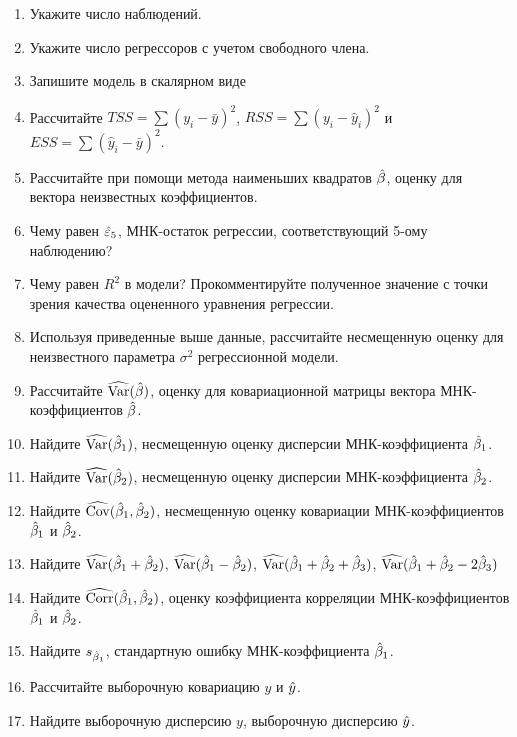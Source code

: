 \begin{problem}
\begin{enumerate}
\item Укажите число наблюдений.
\item Укажите число регрессоров с учетом свободного члена.
\item Запишите модель в скалярном виде
\item Рассчитайте $TSS=\sum (y_i-\bar{y})^2$, $RSS=\sum (y_i-\hat{y}_i)^2$ и $ESS=\sum (\hat{y}_i-\bar{y})^2$.
\item Рассчитайте при помощи метода наименьших квадратов $\hat{\beta}$, оценку для вектора неизвестных коэффициентов.
\item Чему равен $\hat{\varepsilon}_5$, МНК-остаток регрессии, соответствующий 5-ому наблюдению?
\item Чему равен $R^2$  в модели? Прокомментируйте полученное значение с точки зрения качества оцененного уравнения регрессии.
\item Используя приведенные выше данные, рассчитайте несмещенную оценку для неизвестного параметра $\sigma^2$ регрессионной модели.
\item Рассчитайте $\widehat{\operatorname{Var}}(\hat{\beta})$, оценку для ковариационной матрицы вектора МНК-коэффициентов $\hat{\beta}$.  
\item Найдите $\widehat{\operatorname{Var}}(\hat{\beta}_1)$, несмещенную оценку дисперсии МНК-коэффициента $\hat{\beta}_1$.
\item Найдите $\widehat{\operatorname{Var}}(\hat{\beta}_2)$, несмещенную оценку дисперсии МНК-коэффициента $\hat{\beta}_2$.
\item Найдите $\widehat{\operatorname{Cov}}(\hat{\beta}_1,\hat{\beta}_2)$, несмещенную оценку ковариации МНК-коэффициентов $\hat{\beta}_1$ и $\hat{\beta}_2$.
\item Найдите $\widehat{\operatorname{Var}}(\hat{\beta}_1+\hat{\beta}_2)$, $\widehat{\operatorname{Var}}(\hat{\beta}_1-\hat{\beta}_2)$, $\widehat{\operatorname{Var}}(\hat{\beta}_1+\hat{\beta}_2+\hat{\beta}_3)$, $\widehat{\operatorname{Var}}(\hat{\beta}_1+\hat{\beta}_2-2\hat{\beta}_3)$
\item Найдите $\widehat{\operatorname{Corr}}(\hat{\beta}_1,\hat{\beta}_2)$, оценку коэффициента корреляции МНК-коэффициентов $\hat{\beta}_1$ и $\hat{\beta}_2$.
\item Найдите $s_{\hat{\beta}_1}$, стандартную ошибку МНК-коэффициента $\hat{\beta}_1$.
\item Рассчитайте выборочную ковариацию $y$ и $\hat{y}$.
\item Найдите выборочную дисперсию $y$, выборочную дисперсию $\hat{y}$.
\end{enumerate}
\end{problem}
\begin{solution}
\end{solution}


